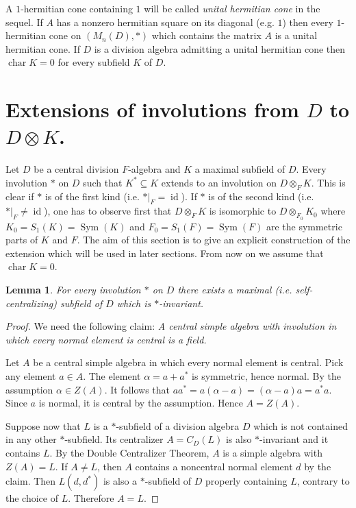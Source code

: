 \documentclass[12pt,reqno]{amsart}
\newtheorem{lem}[thm]{Lemma}
\theoremstyle{definition}
\DeclareMathOperator{\sym}{Sym}
\DeclareMathOperator{\id}{id}
\DeclareMathOperator{\cha}{char}
\begin{document}
A $1$-hermitian cone containing $1$ will be called \textit{unital hermitian cone} in the sequel.
If $A$ has a nonzero hermitian square on its diagonal (e.g. $1$) then every $1$-hermitian cone
on $(M_n(D),\ast)$ which contains the matrix $A$ is a unital hermitian cone. If $D$ is a division
algebra admitting a unital hermitian cone then $\cha K =0$ for every subfield $K$ of $D$.


\section{Extensions of involutions from $D$ to $D \otimes K$.}
\label{secinvo}


Let $D$ be a central division $F$-algebra and $K$ a maximal subfield of $D$.
Every involution $\ast$ on $D$ such that $K^\ast \subseteq K$ extends to an involution
on $D \otimes_F K$. This is clear if $\ast$ is of the first kind (i.e. $\ast|_F =\id$).
If $\ast$ is of the second kind (i.e. $\ast|_F \ne \id$), one has to observe first that
$D \otimes_F K$ is isomorphic to $D \otimes_{F_0} K_0$ where $K_0 = S_1(K)=\sym(K)$
and $F_0 =S_1(F)=\sym(F)$ are the symmetric parts of $K$ and $F$. The aim of this section
is to give an explicit construction of the extension which will be used in later
sections. From now on we assume that $\cha K = 0$.

\begin{lem}
For every involution $\ast$ on $D$ there exists a maximal (i.e. self-centralizing) 
subfield of $D$ which is $\ast$-invariant.
\end{lem}

\begin{proof} We need the following claim:
\textit{A central simple algebra with involution in which every normal element is central is a field.}

Let $A$ be a central simple algebra in which every normal element is central. 
Pick any element $a \in A$. The element $\alpha = a+a^\ast$ is symmetric, hence normal. 
By the assumption $\alpha \in Z(A)$. It follows that $aa^\ast = a(\alpha-a) = (\alpha-a)a = a^\ast a$.
Since $a$ is normal, it is central by the assumption. Hence $A = Z(A)$.

Suppose now that $L$ is a $\ast$-subfield of a division algebra $D$ which is not contained
in any other $\ast$-subfield. Its centralizer $A = C_D(L)$ is also $\ast$-invariant and it contains $L$. 
By the Double Centralizer Theorem, $A$ is a simple algebra with $Z(A)=L$. If $A \ne L$,
then $A$ contains a noncentral normal element $d$ by the claim.  Then $L(d,d^\ast)$ is also a 
$\ast$-subfield of $D$ properly containing $L$, contrary to the choice of $L$. Therefore $A=L$.
\end{proof}
\end{document}
